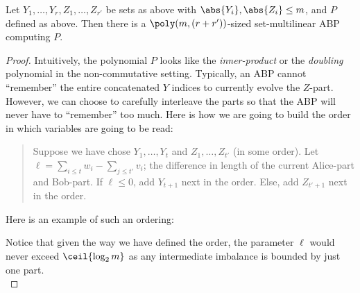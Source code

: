 \begin{lemma}
  Let $Y_1,\ldots, Y_r, Z_1,\ldots, Z_{r'}$ be sets as above with $\abs{Y_i}, \abs{Z_i} \leq m$, and $P$ defined as above. Then there is a $\poly(m, (r+r'))$-sized set-multilinear ABP computing $P$. 
\end{lemma}
\begin{proof}
  Intuitively, the polynomial $P$ looks like the \emph{inner-product} or the \emph{doubling} polynomial in the non-commutative setting. Typically, an ABP cannot ``remember'' the entire concatenated $Y$ indices to currently evolve the $Z$-part. However, we can choose to carefully interleave the parts so that the ABP will never have to ``remember'' too much. Here is how we are going to build the order in which variables are going to be read:
  \begin{quote}
    Suppose we have chose $Y_1,\ldots, Y_t$ and $Z_1,\ldots, Z_{t'}$ (in some order). Let $\ell = \sum_{i \leq t} w_i - \sum_{j \leq t'} v_i$; the difference in length of the current Alice-part and Bob-part. If $\ell\leq 0$, add $Y_{t+1}$ next in the order. Else, add $Z_{t'+1}$ next in the order. 
  \end{quote}

\noindent Here is an example of such an ordering:\\
  
  
  Notice that given the way we have defined the order, the parameter $\ell$ would never exceed $\ceil{\log_2m}$ as any intermediate imbalance is bounded by just one part.\\


\end{proof}
